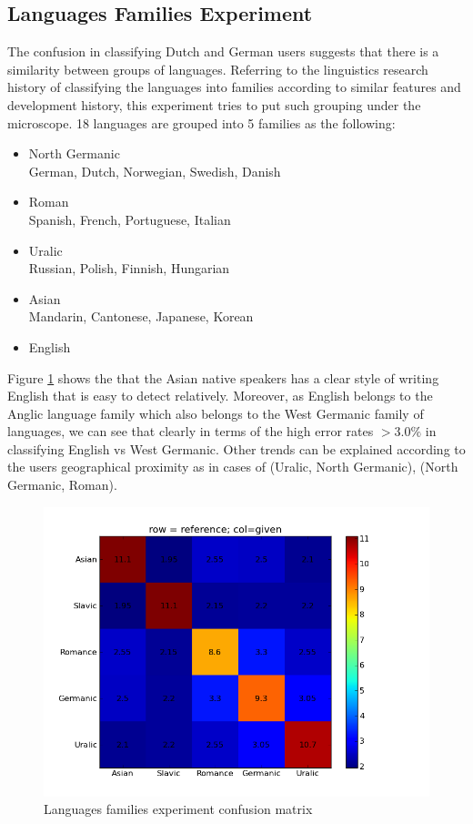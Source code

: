 \documentclass[11pt]{article}
\begin{document}
\subsection{Languages Families Experiment}

The confusion in classifying Dutch and German users suggests that there is a similarity between groups of languages. Referring to the linguistics research history of classifying the languages into families according to similar features and development history, this experiment tries to put such grouping under the microscope. 18 languages are grouped into 5 families as the following:
\begin{itemize}
\item North Germanic\\
German, Dutch, Norwegian, Swedish, Danish
\item Roman\\
Spanish, French, Portuguese, Italian
\item Uralic \\
Russian, Polish, Finnish, Hungarian
\item Asian\\
Mandarin, Cantonese, Japanese, Korean
\item English
\end{itemize}


Figure \ref{fam_cfm} shows the that the Asian native speakers has a clear style of writing English that is easy to detect relatively. Moreover, as English belongs to the Anglic language family which also belongs to the West Germanic family of languages, we can see that clearly in terms of the high error rates $>3.0\%$ in classifying English vs West Germanic. Other trends can be explained according to the users geographical proximity as in cases of (Uralic, North Germanic), (North Germanic, Roman).

\begin{figure}[htp]
\centering
\includegraphics[scale=0.45]{family_cfm.png}
\caption{Languages families experiment confusion matrix}
\label{fam_cfm}
\end{figure}
\end{document}
